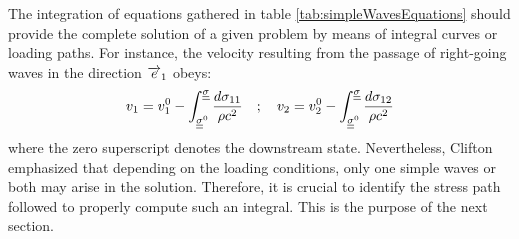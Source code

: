 The integration of equations gathered in table \ref{tab:simpleWavesEquations} should provide the complete solution of a given problem by means of integral curves or loading paths.
For instance, the velocity resulting from the passage of right-going waves in the direction ${\overrightarrow{e}}_1$ obeys:
\begin{equation}
  \label{eq:integral_example}
  v_1 = v_1^0 - \int_{{\underline{\underline{\sigma}}}^0}^{{\underline{\underline{\sigma}}}} \frac{d \sigma_{11}}{\rho c^2} \quad ;\quad v_2 = v_2^0 - \int_{{\underline{\underline{\sigma}}}^0}^{{\underline{\underline{\sigma}}}} \frac{d \sigma_{12}}{\rho c^2}
\end{equation}
where the zero superscript denotes the downstream state.
Nevertheless, Clifton \cite{Clifton} emphasized that depending on the loading conditions, only one simple waves or both may arise in the solution.
Therefore, it is crucial to identify the stress path followed to properly compute such an integral.
This is the purpose of the next section.



